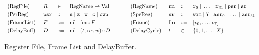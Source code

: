 \begin{figure}[!t]
	\small
	\[
		\begin{array}{llllcllll}
			\TYPE{(RegFile)} & \RFile & \in & 
			\TYPE{RegName} \rightharpoonup \TYPE{Val}
         & \quad \ \ &
        \TYPE{(RegName)} & \regN & \define &
		 \reg{0} \sepline \dots \sepline \reg{31} \sepline \psr \sepline \sr \\
		 \\[-9pt]
		
		\TYPE{(PsrReg)} & \psr & \define &
		\regn \sepline
			\regz \sepline
			\regv \sepline
			\regc \sepline \regcwp & \quad &
		\TYPE{(SpeReg)} & \sr & \define &
		\regwim \sepline
			\regY \sepline
\asr_0 \sepline \dots \sepline \asr_{31} \\ \\[-9pt]
		
		\TYPE{(FrameList)} \  & \Wstack & \define &
            \nil \sepline \fm \stCons \Wstack & \quad &
		\TYPE{(Frame)} & \fm & \define & [\val_0, \dots, \val_7] 
		\\ \\[-9pt]
		
		\TYPE{(DelayBuff)} & \DBuf & \define & \nil \sepline
                                  (\tick, \sr, \word) \dbCons \DBuf
                                  & \quad
		& \TYPE{(DelayCycle)} \ & \tick & \in & \{ 0, 1, \dots, X \}
		\end{array}
	\]

		
		
		
	\caption{Register File, Frame List and DelayBuffer.}
	\label{fig:Register File and Frame List}
\end{figure}

